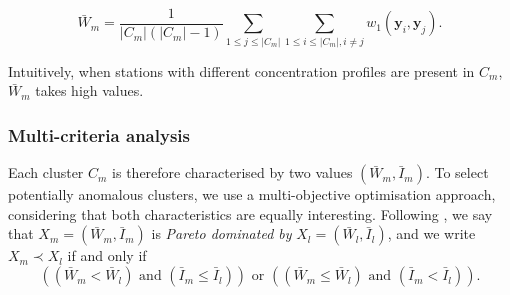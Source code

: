 \begin{equation}\label{chp:5:crit2}
    \bar{W}_m = \frac{1}{|C_m|(|C_m|-1)}\sum_{1 \leq j \leq |C_m|}\sum_{1 \leq i \leq |C_m|, i \neq j}w_1(\mathbf{y}_i,\mathbf{y}_j).
\end{equation}

Intuitively, when stations with different concentration profiles are present in $C_m$, $\bar{W}_m$ takes high values.



\subsubsection{Multi-criteria analysis}

Each cluster $C_m$ is therefore characterised by two values $(\bar{W}_m, \bar{I}_m)$. To select potentially anomalous clusters, we use a multi-objective optimisation approach, considering that both characteristics are equally interesting. Following \cite{KIELING2002311}, we say that  $X_m = (\bar{W}_m, \bar{I}_m)$ is \emph{Pareto dominated by} $X_l = (\bar{W}_l,\bar{I}_l)$, and we write $X_m \prec X_l$ if and only if
\begin{equation*}
    \left((\bar{W}_m<\bar{W}_l)\text{ and }(\bar{I}_m\leq \bar{I}_l)\right)
    \text{ or }\left((\bar{W}_m \leq \bar{W}_l)\text{ and }(\bar{I}_m < \bar{I}_l)\right).
\end{equation*}

